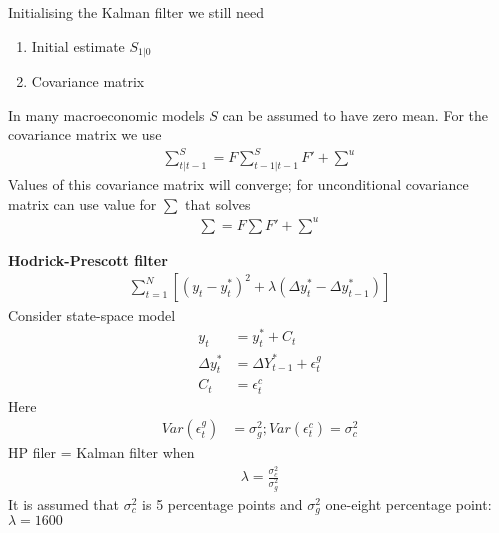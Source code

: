 \documentclass{beamer}
\begin{document}
\begin{frame}
  Initialising the Kalman filter we still need
  \begin{enumerate}
    \item Initial estimate $S_{1|0}$
    \item Covariance matrix
  \end{enumerate}
  \medskip
  In many macroeconomic models $S$ can be assumed to have zero mean. For the covariance matrix we use
  \begin{align}
    \scriptstyle \sum^S_{t|t-1} = \textstyle F \scriptstyle \sum^S_{t-1|t-1} \textstyle F' + \scriptstyle \sum^u
  \end{align}
  Values of this covariance matrix will converge; for unconditional covariance matrix can use value for $\sum$ that solves
  \begin{align}
    \scriptstyle \sum=\textstyle F \scriptstyle \sum \textstyle F' + \scriptstyle \sum^u
  \end{align}
\end{frame}

\begin{frame}
  \textbf{Hodrick-Prescott filter}
  \begin{align}
    \sum_{t=1}^{N} [(y_t - y_t^*)^2+ \lambda(\Delta y_t^* - \Delta y_{t-1}^*)]
  \end{align}
  Consider state-space model
  \begin{align}
    y_t &= y^*_t+C_t\\
    \Delta y^*_t &= \Delta Y^*_{t-1} + \epsilon^g_t \\
    C_t &= \epsilon_t^c
  \end{align}
  Here
  \begin{align}
    Var(\epsilon^g_t) &= \sigma_g^2; Var(\epsilon_t^c) = \sigma_c^2
  \end{align}
  HP filer = Kalman filter when
  \begin{align}
    \lambda = \frac{\sigma_c^2}{\sigma_g^2} 
  \end{align}
  It is assumed that $\sigma_c^2$ is 5 percentage points and $\sigma_g^2$ one-eight percentage point: $\lambda=1600$
\end{frame}

\end{document}
